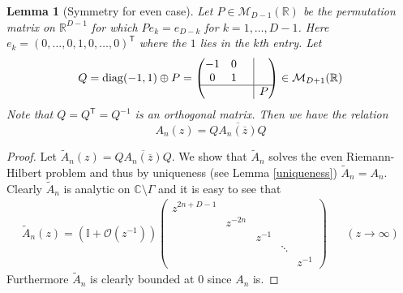 \documentclass[12pt]{article}
\newtheorem{lemma}[theorem]{Lemma}
\newcommand*{\bord}{\multicolumn{1}{c|}{}}
\theoremstyle{definition}
\begin{document}
\begin{lemma}[Symmetry for even case]\label{EvenSymmetry} Let $P \in \mathcal{M}_{D-1}(\mathbb{R})$ be the permutation matrix on $\mathbb{R}^{D-1}$ for which $P e_k = e_{D-k}$ for $k = 1, \dots, D-1$. Here $e_k = (0, \dots, 0, 1, 0, \dots, 0)^\mathsf{T}$ where the $1$ lies in the $k$th entry. Let $$Q = \mathrm{diag}(-1,1) \oplus P = \left( \begin{matrix} -1 & 0 & \bord & \\
0 & 1 & \bord &\\ \hline
& & \bord & P\end{matrix} \right) \in \mathcal{M}_{D+1}(\mathbb{R})$$ Note that $Q = Q^\mathsf{T} = Q^{-1}$ is an orthogonal matrix.  Then we have the relation
$$A_{n}(z) = Q \overline{A_{n}(\overline{z}) } Q$$
\end{lemma}
\begin{proof}
Let $\tilde{A}_{n}(z) = Q \overline{A_{n}(\overline{z})}  Q$. We show that $\tilde{A}_{n}$ solves the even Riemann-Hilbert problem and thus by uniqueness (see Lemma \ref{uniqueness}) $\tilde{A}_{n} = A_{n}$. Clearly $\tilde{A}_{n}$ is analytic on $\mathbb{C}\setminus \Gamma$ and it is easy to see that
\begin{align*}
\tilde{A}_{n}(z) = \left(\mathbb{I}+ \mathcal{O}(z^{-1})\right) \left(\begin{matrix}
z^{2n+D-1} \\
& z^{-2n} \\
& & z^{-1} \\
& & & \ddots  \\
& & & & z^{-1}
\end{matrix} \right) & & (z \to \infty)
\end{align*}
Furthermore $\tilde{A}_{n}$ is clearly bounded at $0$ since $A_{n}$ is.


\end{proof}
\end{document}
